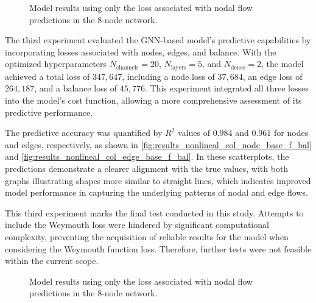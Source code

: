 \begin{figure}
    \centering
    \setlength{}        
    \setlength{} 
    
    \caption{Model results using only the loss associated with nodal flow predictions in the 8-node network.}
    \label{fig:col_base_bal_results_non_lineal}
\end{figure}




The third experiment evaluated the GNN-based model's predictive capabilities by incorporating losses associated with nodes, edges, and balance. With the optimized hyperparameters \( N_{\text{channels}} = 20 \), \( N_{\text{layers}} = 5 \), and \( N_{\text{dense}} = 2 \), the model achieved a total loss of \( 347,647 \), including a node loss of \( 37,684 \), an edge loss of \( 264,187 \), and a balance loss of \( 45,776 \). This experiment integrated all three losses into the model's cost function, allowing a more comprehensive assessment of its predictive performance.

The predictive accuracy was quantified by \( R^2 \) values of \( 0.984 \) and \( 0.961 \) for nodes and edges, respectively, as shown in \cref{fig:results_nonlineal_col_node_base_f_bal} and \cref{fig:results_nonlineal_col_edge_base_f_bal}. In these scatterplots, the predictions demonstrate a clearer alignment with the true values, with both graphs illustrating shapes more similar to straight lines, which indicates improved model performance in capturing the underlying patterns of nodal and edge flows.

This third experiment marks the final test conducted in this study. Attempts to include the Weymouth loss were hindered by significant computational complexity, preventing the acquisition of reliable results for the model when considering the Weymouth function loss. Therefore, further tests were not feasible within the current scope.

\begin{figure}
    \centering
    \setlength{}        
    \setlength{} 
    
    \caption{Model results using only the loss associated with nodal flow predictions in the 8-node network.}
    \label{fig:col_base_f_bal_results_non_lineal}
\end{figure}



